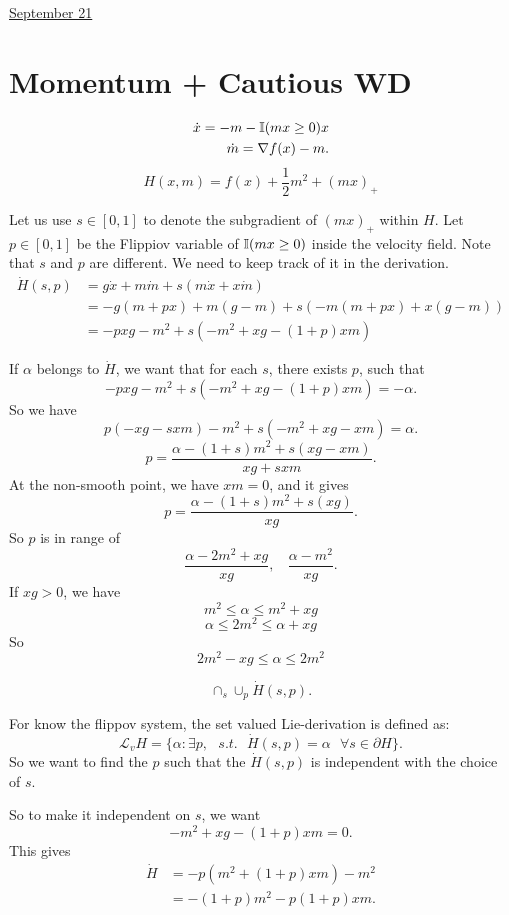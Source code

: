 \documentclass[letterpaper,11pt]{article}
\begin{document}
\clearpage


\href{run:2025-09-21-momentum_cwd.tex}{\Huge September 21} 

\section{Momentum + Cautious WD}

\begin{align}
    \dot x = - m - \mathbb{I}(mx\geq 0) x \\ 
    \dot m = \nabla f(x) - m. 
\end{align}
$$
H(x, m) = f(x) + \frac{1}{2} m^2 + (mx)_+
$$

Let us use $s \in[0,1]$ to denote the subgradient of $(mx)_+$ within $H$. Let $p \in[0,1]$ be the Flippiov variable of $\mathbb{I}(mx \geq 0)$ inside the velocity field. Note that $s$ and $p$ are different. We need to keep track of it in the derivation. 
\begin{align*}
\dot H(s,p) &  =  g \dot x + m \dot m + s (m \dot x + x \dot m) \\ 
& = -g (m + p x) + m(g - m) + s (-m (m + p x) + x (g - m) )\\
& = - p x g - m^2 + s (- m^2 + xg - (1+p)xm)
\end{align*}

If $\alpha$ belongs to $\dot H$, we want that for each $s$, there exists $p$, such that 
$$
- p x g - m^2 + s (- m^2 + xg - (1+p)xm) = -\alpha.
$$
So we have 
$$
p (-xg - s x m ) - m^2 + s (-m^2 + xg - xm) = \alpha. 
$$
$$
p = \frac{\alpha -(1+s) m^2 + s (xg - xm)}{xg +  s xm}. 
$$
At the non-smooth point, we have $xm =0$, and it gives 
$$
p = \frac{\alpha -(1+s) m^2 + s (xg)}{xg}.  
$$
So $p$ is in range of 
$$
\frac{\alpha - 2m^2 + xg}{xg}, ~~~~ 
\frac{\alpha - m^2 }{xg}. 
$$
If $xg >0$, we have 
$$
m^2 \leq \alpha \leq m^2 + xg
$$
$$
\alpha \leq 2m^2 \leq \alpha + xg 
$$
So 
$$
2m^2  - xg \leq \alpha \leq 2 m^2
$$

$$\cap_{s} \cup_{p} \dot H(s, p).$$


For know the flippov system, the set valued Lie-derivation is defined as:
$$
\mathcal L_v H  =   
\{\alpha \colon \exists p, ~~~ s.t. ~~~ \dot H(s,p) = \alpha ~~~\forall s \in \partial H \}.
$$
So we want to find the $p$ such that the $\dot H(s,p)$ is independent with the choice of $s$. 

So to make it independent on $s$, we want 
$$
-m^2 + xg -(1+p)xm  = 0.
$$
This gives
\begin{align*}
\dot H 
& = -p(m^2 + (1+p) xm)- m^2 \\
& = -(1+p)m^2 - p(1+p) xm. 
\end{align*}
\end{document}
